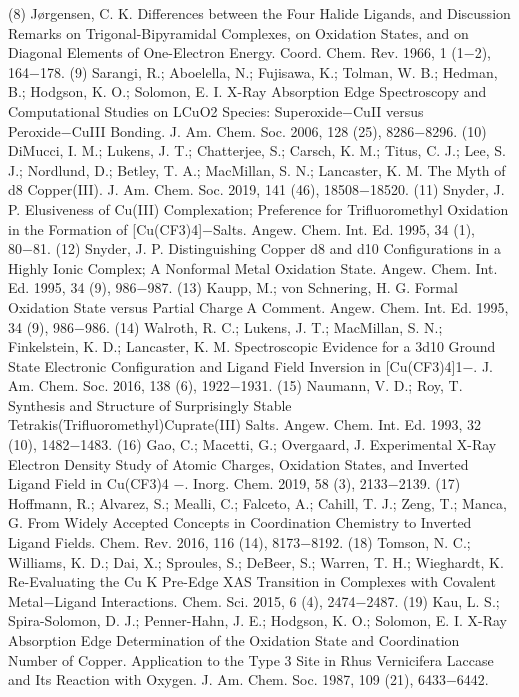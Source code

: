 \documentclass{article}
\begin{document}
(8) Jørgensen, C. K. Differences between the Four Halide Ligands,
and Discussion Remarks on Trigonal-Bipyramidal Complexes, on
Oxidation States, and on Diagonal Elements of One-Electron Energy.
Coord. Chem. Rev. 1966, 1 (1−2), 164−178.
(9) Sarangi, R.; Aboelella, N.; Fujisawa, K.; Tolman, W. B.; Hedman,
B.; Hodgson, K. O.; Solomon, E. I. X-Ray Absorption Edge
Spectroscopy and Computational Studies on LCuO2 Species:
Superoxide−CuII versus Peroxide−CuIII Bonding. J. Am. Chem. Soc.
2006, 128 (25), 8286−8296.
(10) DiMucci, I. M.; Lukens, J. T.; Chatterjee, S.; Carsch, K. M.;
Titus, C. J.; Lee, S. J.; Nordlund, D.; Betley, T. A.; MacMillan, S. N.;
Lancaster, K. M. The Myth of d8 Copper(III). J. Am. Chem. Soc. 2019,
141 (46), 18508−18520.
(11) Snyder, J. P. Elusiveness of Cu(III) Complexation; Preference
for Trifluoromethyl Oxidation in the Formation of [Cu(CF3)4]−Salts.
Angew. Chem. Int. Ed. 1995, 34 (1), 80−81.
(12) Snyder, J. P. Distinguishing Copper d8 and d10 Configurations
in a Highly Ionic Complex; A Nonformal Metal Oxidation State.
Angew. Chem. Int. Ed. 1995, 34 (9), 986−987.
(13) Kaupp, M.; von Schnering, H. G. Formal Oxidation State versus
Partial ChargeA Comment. Angew. Chem. Int. Ed. 1995, 34 (9),
986−986.
(14) Walroth, R. C.; Lukens, J. T.; MacMillan, S. N.; Finkelstein, K.
D.; Lancaster, K. M. Spectroscopic Evidence for a 3d10 Ground State
Electronic Configuration and Ligand Field Inversion in [Cu(CF3)4]1−.
J. Am. Chem. Soc. 2016, 138 (6), 1922−1931.
(15) Naumann, V. D.; Roy, T. Synthesis and Structure of
Surprisingly Stable Tetrakis(Trifluoromethyl)Cuprate(III) Salts.
Angew. Chem. Int. Ed. 1993, 32 (10), 1482−1483.
(16) Gao, C.; Macetti, G.; Overgaard, J. Experimental X-Ray
Electron Density Study of Atomic Charges, Oxidation States, and
Inverted Ligand Field in Cu(CF3)4
−. Inorg. Chem. 2019, 58 (3),
2133−2139.
(17) Hoffmann, R.; Alvarez, S.; Mealli, C.; Falceto, A.; Cahill, T. J.;
Zeng, T.; Manca, G. From Widely Accepted Concepts in
Coordination Chemistry to Inverted Ligand Fields. Chem. Rev.
2016, 116 (14), 8173−8192.
(18) Tomson, N. C.; Williams, K. D.; Dai, X.; Sproules, S.; DeBeer,
S.; Warren, T. H.; Wieghardt, K. Re-Evaluating the Cu K Pre-Edge
XAS Transition in Complexes with Covalent Metal−Ligand
Interactions. Chem. Sci. 2015, 6 (4), 2474−2487.
(19) Kau, L. S.; Spira-Solomon, D. J.; Penner-Hahn, J. E.; Hodgson,
K. O.; Solomon, E. I. X-Ray Absorption Edge Determination of the
Oxidation State and Coordination Number of Copper. Application to
the Type 3 Site in Rhus Vernicifera Laccase and Its Reaction with
Oxygen. J. Am. Chem. Soc. 1987, 109 (21), 6433−6442.
\end{document}
